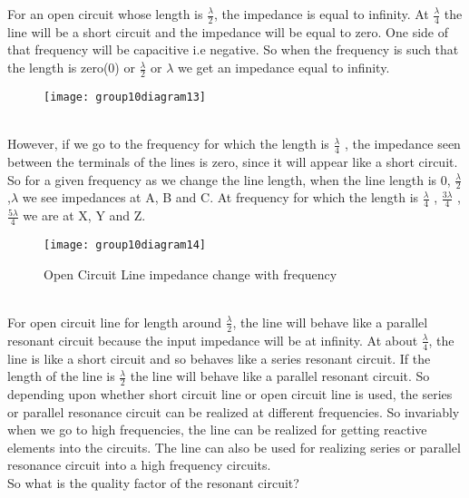 For an open circuit whose length is $ \frac{\lambda}{2} $, the impedance is equal to infinity. At $ \frac{\lambda}{4} $ the line will be a short circuit and the impedance will be equal to zero. One side of that frequency will be capacitive i.e negative. So when the frequency is such that the length is zero(0) or $ \frac{\lambda}{2} $ or $ \lambda$ we get an impedance equal to infinity.\\
\begin{figure}[h]
	\centering
	\texttt{[image: group10diagram13]}
\end{figure}\\However, if we go to the frequency for which the length is $ \frac{\lambda}{4} $ , the impedance seen between the terminals of the lines is zero, since it will appear like a short circuit. So for a given frequency as we change the line length, when the line
length is 0, $ \frac{\lambda}{2} $ ,$ \lambda $ we see impedances at A, B and C. At frequency for which the length is $ \frac{\lambda}{4} $ , $ \frac{3\lambda}{4} $ , $ \frac{5\lambda}{4} $ we are at X, Y and Z.\\
\begin{figure}[h]
	\centering
	\texttt{[image: group10diagram14]}
	\caption{Open Circuit Line impedance change with frequency}
\end{figure}\\For open circuit line for length around $ \frac{\lambda}{2} $, the line will behave like a parallel resonant circuit because the input impedance will be at infinity. At about $ \frac{\lambda}{4} $, the line is like a short circuit and so behaves like a series resonant circuit. If the length of the line is $ \frac{\lambda}{2} $ the line will behave like a parallel resonant circuit.
So depending upon whether short circuit line or open circuit line is used, the series or parallel resonance circuit can be realized at different frequencies. So invariably when we go to high frequencies, the line can be realized for getting reactive elements into the circuits. The line can also be used for realizing series or parallel resonance circuit into a high frequency circuits.\\
So what is the quality factor of the resonant circuit?\\

